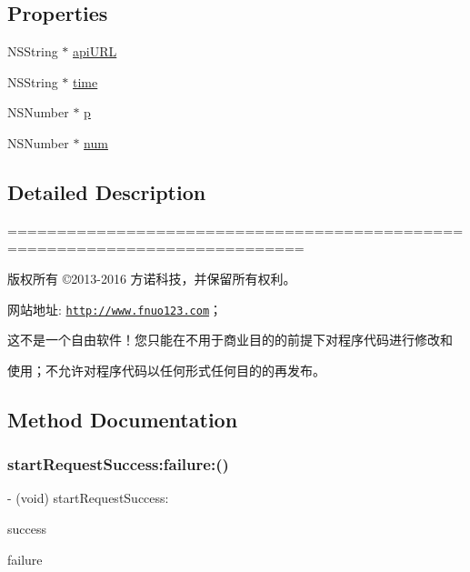 \subsection*{Properties}
\begin{DoxyCompactItemize}
\item 
N\+S\+String $\ast$ \mbox{\hyperlink{interface_f_n_a_p_i_public_tool_a9dfd166fa4a711f412d7aa913605bced}{api\+U\+RL}}
\item 
N\+S\+String $\ast$ \mbox{\hyperlink{interface_f_n_a_p_i_public_tool_a22c8fd18c744abdce437586e7769a874}{time}}
\item 
N\+S\+Number $\ast$ \mbox{\hyperlink{interface_f_n_a_p_i_public_tool_a941375bc980d0bf7c4f9920f8f8889e2}{p}}
\item 
N\+S\+Number $\ast$ \mbox{\hyperlink{interface_f_n_a_p_i_public_tool_ab7800f575488a97ea7762893ace23088}{num}}
\end{DoxyCompactItemize}


\subsection{Detailed Description}
============================================================================

版权所有 ©2013-\/2016 方诺科技，并保留所有权利。

网站地址\+: \href{http://www.fnuo123.com}{\tt http\+://www.\+fnuo123.\+com}； 



这不是一个自由软件！您只能在不用于商业目的的前提下对程序代码进行修改和

使用；不允许对程序代码以任何形式任何目的的再发布。 

 

\subsection{Method Documentation}
\mbox{\label{interface_f_n_a_p_i_public_tool_ad62ba4530284f2eb3acaccb4ae5e361d}} 
\subsubsection{\texorpdfstring{start\+Request\+Success\+:failure\+:()}{startRequestSuccess:failure:()}}
{\footnotesize\ttfamily -\/ (void) start\+Request\+Success\+: \begin{DoxyParamCaption}\item[{(Success\+Request)}]{success }\item[{failure:(Failure\+Request)}]{failure }\end{DoxyParamCaption}}

